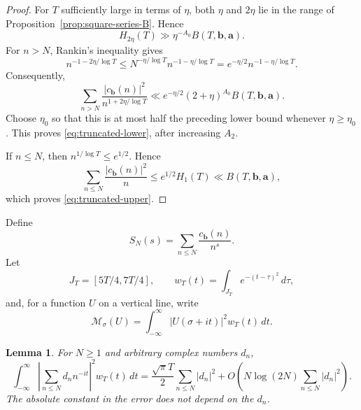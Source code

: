 \documentclass[11pt]{amsart}
\numberwithin{equation}{section}
\theoremstyle{plain}
\newtheorem{lem}{Lemma}[section]
\renewcommand{\le}{\leqslant}
\renewcommand{\ge}{\geqslant}
\begin{document}
\begin{proof}
For $T$ sufficiently large in terms of $\eta$, both $\eta$ and $2\eta$
lie in the range of Proposition~\ref{prop:square-series-B}.  Hence
\begin{equation*}
H_{2\eta}(T)\gg \eta^{-A_0}B(T,\mathbf b,\mathbf a).
\end{equation*}
For $n>N$, Rankin's inequality gives
\begin{equation*}
n^{-1-2\eta/\log T}
\le N^{-\eta/\log T}n^{-1-\eta/\log T}
=e^{-\eta/2}n^{-1-\eta/\log T}.
\end{equation*}
Consequently,
\begin{equation*}
\sum_{n>N}\frac{|c_{\mathbf b}(n)|^2}
{n^{1+2\eta/\log T}}
\ll e^{-\eta/2}(2+\eta)^{A_0}
B(T,\mathbf b,\mathbf a).
\end{equation*}
Choose $\eta_0$ so that this is at most half the preceding lower bound
whenever $\eta\ge\eta_0$.  This proves \eqref{eq:truncated-lower}, after
increasing $A_2$.

If $n\le N$, then $n^{1/\log T}\le e^{1/2}$.  Hence
\begin{equation*}
\sum_{n\le N}\frac{|c_{\mathbf b}(n)|^2}{n}
\le e^{1/2}H_1(T)\ll B(T,\mathbf b,\mathbf a),
\end{equation*}
which proves \eqref{eq:truncated-upper}.
\end{proof}

Define
\begin{equation}\label{eq:S-definition}
S_N(s)=\sum_{n\le N}\frac{c_{\mathbf b}(n)}{n^s}.
\end{equation}
Let
\begin{equation}\label{eq:gaussian-weight}
J_T=[5T/4,7T/4],\qquad
w_T(t)=\int_{J_T}e^{-(t-\tau)^2}\,d\tau,
\end{equation}
and, for a function $U$ on a vertical line, write
\begin{equation}\label{eq:weighted-norm}
\mathcal M_\sigma(U)=
\int_{-\infty}^{\infty}|U(\sigma+it)|^2w_T(t)\,dt.
\end{equation}

\begin{lem}\label{lem:weighted-mean-value}
For $N\ge1$ and arbitrary complex numbers $d_n$,
\begin{equation}\label{eq:weighted-mean-value}
\int_{-\infty}^{\infty}
\left|\sum_{n\le N}d_n n^{-it}\right|^2w_T(t)\,dt
=\frac{\sqrt\pi T}{2}\sum_{n\le N}|d_n|^2
+O\left(N\log(2N)\sum_{n\le N}|d_n|^2\right).
\end{equation}
The absolute constant in the error does not depend on the $d_n$.
\end{lem}
\end{document}
